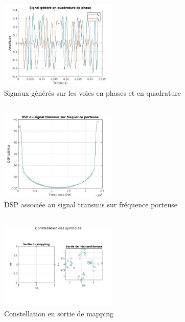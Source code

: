 \documentclass[a4paper, 12pt]{article}
\begin{document}
\subsection{}
\begin{figure}[H]
    \centering
    \includegraphics[width=0.5\textwidth]{graphics/2-1.jpg}
    \caption{Signaux générés sur les voies en phases et en quadrature}
    \label{fig:mon_etiquette}
\end{figure}

\subsection{}
\begin{figure}[H]
    \centering
    \includegraphics[width=0.5\textwidth]{graphics/2-2.jpg}
    \caption{DSP associée au signal transmis sur fréquence porteuse}
    \label{fig:mon_etiquette}
\end{figure}

\subsection{}

\subsection{}
\begin{figure}[H]
    \centering
    \includegraphics[width=0.5\textwidth]{graphics/2-4.jpg}
    \caption{Constellation en sortie de mapping}
    \label{fig:mon_etiquette}
\end{figure}
\end{document}
